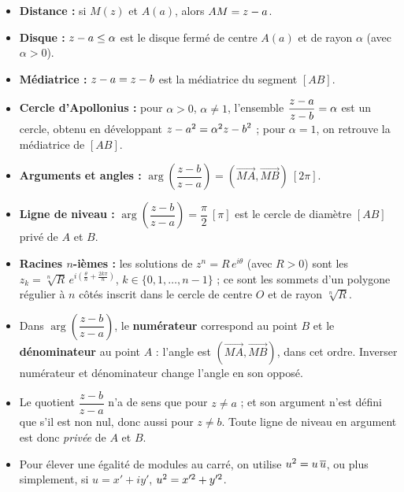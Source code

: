 \documentclass[11pt]{article}
\providecommand{\abs}{}\let\abs\relax\DeclarePairedDelimiter{\abs}{\lvert}{\rvert}
\begin{document}
\begin{aretenir}
\begin{itemize}
\item \textbf{Distance :} si $M(z)$ et $A(a)$, alors $AM = \abs{z-a}$.
\item \textbf{Disque :} $\abs{z-a}\leq\alpha$ est le disque fermé de centre $A(a)$ et de rayon $\alpha$ (avec $\alpha > 0$).
\item \textbf{Médiatrice :} $\abs{z-a}=\abs{z-b}$ est la médiatrice du segment $[AB]$.
\item \textbf{Cercle d'Apollonius :} pour $\alpha>0$, $\alpha\neq 1$, l'ensemble $\abs{\dfrac{z-a}{z-b}}=\alpha$ est un cercle, obtenu en développant $\abs{z-a}^2=\alpha^2\abs{z-b}^2$ ; pour $\alpha = 1$, on retrouve la médiatrice de $[AB]$.
\item \textbf{Arguments et angles :} $\arg\!\left(\dfrac{z-b}{z-a}\right) = \left(\overrightarrow{MA},\overrightarrow{MB}\right)\ [2\pi]$.
\item \textbf{Ligne de niveau :} $\arg\!\left(\dfrac{z-b}{z-a}\right)=\dfrac{\pi}{2}\ [\pi]$ est le cercle de diamètre $[AB]$ privé de $A$ et $B$.
\item \textbf{Racines $n$-ièmes :} les solutions de $z^n = R\,e^{i\theta}$ (avec $R>0$) sont les $z_k = \sqrt[n]{R}\,e^{i\left(\frac{\theta}{n}+\frac{2k\pi}{n}\right)}$, $k\in\{0,1,\dots,n-1\}$ ; ce sont les sommets d'un polygone régulier à $n$ côtés inscrit dans le cercle de centre $O$ et de rayon $\sqrt[n]{R}$.
\end{itemize}
\end{aretenir}

\begin{attention}
\begin{itemize}
\item Dans $\arg\!\left(\dfrac{z-b}{z-a}\right)$, le \textbf{numérateur} correspond au point $B$ et le \textbf{dénominateur} au point $A$ : l'angle est $\left(\overrightarrow{MA},\overrightarrow{MB}\right)$, dans cet ordre. Inverser numérateur et dénominateur change l'angle en son opposé.
\item Le quotient $\dfrac{z-b}{z-a}$ n'a de sens que pour $z \neq a$ ; et son argument n'est défini que s'il est non nul, donc aussi pour $z \neq b$. Toute ligne de niveau en argument est donc \emph{privée} de $A$ et $B$.
\item Pour élever une égalité de modules au carré, on utilise $\abs{u}^2 = u\,\overline{u}$, ou plus simplement, si $u = x'+iy'$, $\abs{u}^2 = x'^2 + y'^2$.
\end{itemize}
\end{attention}
\end{document}
